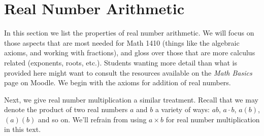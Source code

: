 \section{Real Number Arithmetic}
\label{RealNumberArithmetic}


In this section we list the properties of real number arithmetic.  We will focus on those aspects that are most needed for Math 1410 (things like the algebraic axioms, and working with fractions), and gloss over those that are more calculus related (exponents, roots, etc.). Students wanting more detail than what is provided here might want to consult the resources available on the \textit{Math Basics} page on Moodle. We begin with the axioms for addition of real numbers.

\medskip


\medskip

Next, we give real number multiplication a similar treatment.  Recall that we may denote the product of two real numbers $a$ and $b$ a variety of ways:  $ab$, $a \cdot b$, $a(b)$, $(a)(b)$ and so on.  We'll refrain from using $a \times b$ for real number multiplication in this text.

\medskip

